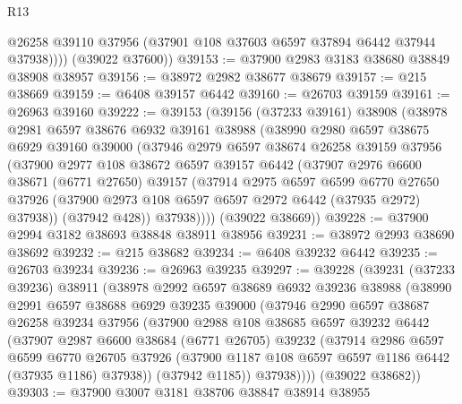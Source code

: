 \begin{lexlean}{R13}
\begin{coremodule}
            @26258
            @39110
            @37956
            (@37901 @108 @37603 @6597 @37894 @6442 @37944 @37938))))
      (@39022 @37600))
@39153 := @37900 @2983 @3183 @38680 @38849 @38908 @38957
@39156 := @38972 @2982 @38677 @38679
@39157 := @215 @38669
@39159 := @6408 @39157 @6442
@39160 := @26703 @39159
@39161 := @26963 @39160
@39222 := @39153
    (@39156
      (@37233 @39161)
      @38908
      (@38978
        @2981
        @6597
        @38676
        @6932
        @39161
        @38988
        (@38990
          @2980
          @6597
          @38675
          @6929
          @39160
          @39000
          (@37946
            @2979
            @6597
            @38674
            @26258
            @39159
            @37956
            (@37900
              @2977
              @108
              @38672
              @6597
              @39157
              @6442
              (@37907
                @2976
                @6600
                @38671
                (@6771 @27650)
                @39157
                (@37914
                  @2975
                  @6597
                  @6599
                  @6770
                  @27650
                  @37926
                  (@37900 @2973 @108 @6597 @6597 @2972 @6442 (@37935 @2972) @37938))
                (@37942 @428))
              @37938))))
      (@39022 @38669))
@39228 := @37900 @2994 @3182 @38693 @38848 @38911 @38956
@39231 := @38972 @2993 @38690 @38692
@39232 := @215 @38682
@39234 := @6408 @39232 @6442
@39235 := @26703 @39234
@39236 := @26963 @39235
@39297 := @39228
    (@39231
      (@37233 @39236)
      @38911
      (@38978
        @2992
        @6597
        @38689
        @6932
        @39236
        @38988
        (@38990
          @2991
          @6597
          @38688
          @6929
          @39235
          @39000
          (@37946
            @2990
            @6597
            @38687
            @26258
            @39234
            @37956
            (@37900
              @2988
              @108
              @38685
              @6597
              @39232
              @6442
              (@37907
                @2987
                @6600
                @38684
                (@6771 @26705)
                @39232
                (@37914
                  @2986
                  @6597
                  @6599
                  @6770
                  @26705
                  @37926
                  (@37900 @1187 @108 @6597 @6597 @1186 @6442 (@37935 @1186) @37938))
                (@37942 @1185))
              @37938))))
      (@39022 @38682))
@39303 := @37900 @3007 @3181 @38706 @38847 @38914 @38955

\end{coremodule}
\end{lexlean}
